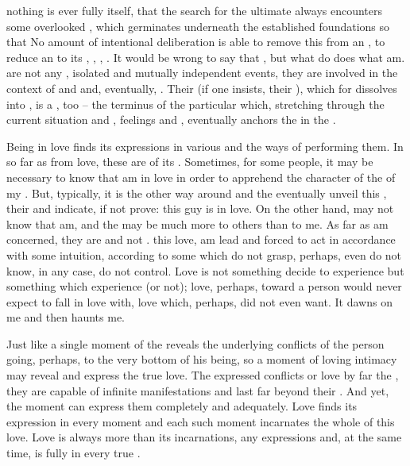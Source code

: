 nothing is ever fully itself, that the search for the ultimate 
always encounters some overlooked , which germinates underneath the
established foundations so that  No amount of
intentional deliberation is able to remove this   from
an , to reduce an  to its ,  ,
, .  It would be wrong to say that , but
what  do does  what  am.   are not any
, isolated and mutually independent events, they are involved in
the context of  and  and, eventually, 
.  Their  (if one insists, their ), which for
 dissolves into , is a , too -- the terminus
of the particular  which, stretching through the current situation and
, feelings and , eventually anchors the 
in the .


\pa Being in love finds its expressions in various  and the ways of
performing them. In so far as   from love, these  are
 of its . Sometimes, for some people, it may be necessary
to know that  am in love in order to apprehend the character of the
 of my . But, typically, it is the other way around and the
 eventually unveil this , their  and 
indicate, if not prove: {this guy is in love}.  On the other hand, 
 may not know that  am, and the  may be much more
 to others than to me. As far as  am concerned, they are
 and not .  this love,  am lead and
forced to act in accordance with some  intuition, according to some
 which  do not grasp, perhaps, even do not know, in
any case, do not control. Love is not something  decide to experience but
something which  experience (or not); love, perhaps, toward a person
 would never expect  to fall in love with, love which,
perhaps,  did not even want.  It dawns on me and then haunts me.

Just like a single moment of the  reveals the underlying
conflicts of the person going, perhaps, to the very bottom of his being, so a
moment of loving intimacy may reveal and express the true love.  The expressed
conflicts or love  by far the \hoa, they are capable of infinite
manifestations and last far beyond their . And yet, the moment can
express them completely and adequately. Love finds its expression in every
moment and each such moment {incarnates} the whole  of this love.
Love is always more than its {incarnations},  any 
expressions and, at the same time, is fully  in every true .

